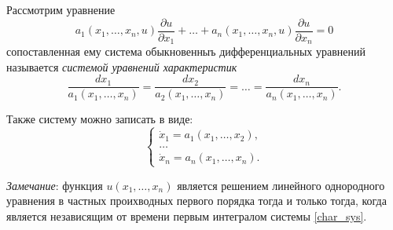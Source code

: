 Рассмотрим уравнение
\begin{equation*}
	a_1(x_1, \dotsc, x_n, u) \frac{\partial u}{\partial x_1} + \dotsc + a_n(x_1, \dotsc, x_n, u) \frac{\partial u}{\partial x_n} = 0
\end{equation*}
сопоставленная ему система обыкновенныъ дифференциальных уравнений называется \textit{системой уравнений характеристик}
\begin{equation}
	\frac{d x_1}{a_1(x_1, \dotsc, x_n)} = \frac{d x_2}{a_2(x_1, \dotsc, x_n)} = \dotsc = \frac{d x_n}{a_n(x_1, \dotsc, x_n)}.
\end{equation}

Также систему можно записать в виде:
\begin{equation}  \label{char_sys}
	\begin{cases}
		\dot{x}_1 = a_1(x_1, \dotsc, x_2), \\
		\dotsc \\
		\dot{x}_n = a_n(x_1, \dotsc, x_n).
	\end{cases} \tag{5'}
\end{equation}

\textit{Замечание}: функция $ u(x_1, \dotsc, x_n) $ является решением линейного однородного уравнения в частных проихводных первого порядка тогда и только тогда, когда является независящим от времени первым интегралом системы \eqref{char_sys}. 
